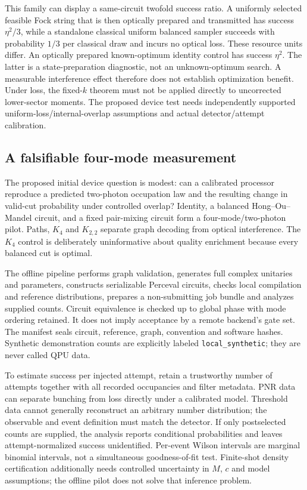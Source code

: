 \documentclass[11pt,a4paper]{article}
\theoremstyle{remark}\newtheorem{remark}[theorem]{Remark}
\begin{document}
This family can display a same-circuit twofold success ratio. A uniformly selected feasible Fock string that is then optically prepared and transmitted has success $\eta^2/3$, while a standalone classical uniform balanced sampler succeeds with probability $1/3$ per classical draw and incurs no optical loss. These resource units differ. An optically prepared known-optimum identity control has success $\eta^2$. The latter is a state-preparation diagnostic, not an unknown-optimum search. A measurable interference effect therefore does not establish optimization benefit. Under loss, the fixed-$k$ theorem must not be applied directly to uncorrected lower-sector moments. The proposed device test needs independently supported uniform-loss/internal-overlap assumptions and actual detector/attempt calibration.

\subsection{A falsifiable four-mode measurement}
The proposed initial device question is modest: can a calibrated processor reproduce a predicted two-photon occupation law and the resulting change in valid-cut probability under controlled overlap? Identity, a balanced Hong--Ou--Mandel circuit, and a fixed pair-mixing circuit form a four-mode/two-photon pilot. Paths, $K_4$ and $K_{2,2}$ separate graph decoding from optical interference. The $K_4$ control is deliberately uninformative about quality enrichment because every balanced cut is optimal.

The offline pipeline performs graph validation, generates full complex unitaries and parameters, constructs serializable Perceval circuits, checks local compilation and reference distributions, prepares a non-submitting job bundle and analyzes supplied counts. Circuit equivalence is checked up to global phase with mode ordering retained. It does not imply acceptance by a remote backend's gate set. The manifest seals circuit, reference, graph, convention and software hashes. Synthetic demonstration counts are explicitly labeled \texttt{local\_synthetic}; they are never called QPU data.

To estimate success per injected attempt, retain a trustworthy number of attempts together with all recorded occupancies and filter metadata. PNR data can separate bunching from loss directly under a calibrated model. Threshold data cannot generally reconstruct an arbitrary number distribution; the observable and event definition must match the detector. If only postselected counts are supplied, the analysis reports conditional probabilities and leaves attempt-normalized success unidentified. Per-event Wilson intervals are marginal binomial intervals, not a simultaneous goodness-of-fit test. Finite-shot density certification additionally needs controlled uncertainty in $M$, $c$ and model assumptions; the offline pilot does not solve that inference problem.
\end{document}
